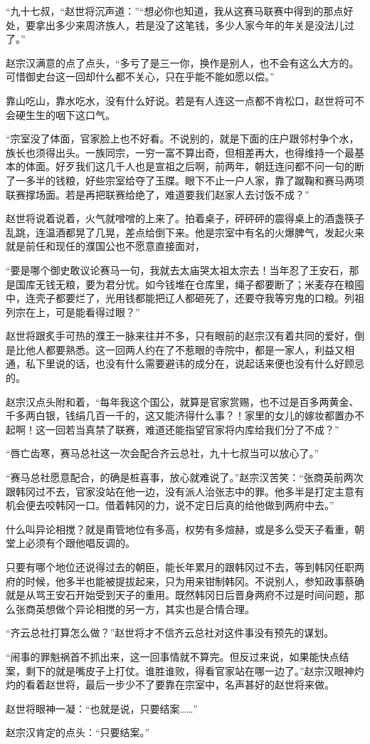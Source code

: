 “九十七叔，“赵世将沉声道：”“想必你也知道，我从这赛马联赛中得到的那点好处，要拿出多少来周济族人，若是没了这笔钱，多少人家今年的年关是没法儿过了。”

赵宗汉满意的点了点头，“多亏了是三一你，换作是别人，也不会有这么大方的。可惜御史台这一回却什么都不关心，只在乎能不能如愿以偿。”

靠山吃山，靠水吃水，没有什么好说。若是有人连这一点都不肯松口，赵世将可不会硬生生的咽下这口气。

“宗室没了体面，官家脸上也不好看。不说别的，就是下面的庄户跟邻村争个水，族长也须得出头。一族同宗，一穷一富不算出奇，但相差再大，也得维持一个最基本的体面。好歹我们这几千人也是宣祖之后啊，前两年，朝廷连问都不问一句的断了一多半的钱粮，好些宗室给夺了玉牒。眼下不止一户人家，靠了蹴鞠和赛马两项联赛撑场面。若是再把联赛给绝了，难道要我们赵家人去讨饭不成？”

赵世将说着说着，火气就噌噌的上来了。拍着桌子，砰砰砰的震得桌上的酒盏筷子乱跳，连温酒都晃了几晃，差点给倒下来。他是宗室中有名的火爆脾气，发起火来就是前任和现任的濮国公也不愿意直接面对，

“要是哪个御史敢议论赛马一句，我就去太庙哭太祖太宗去！当年忍了王安石，那是国库无钱无粮，要为君分忧。如今钱堆在仓库里，绳子都要断了；米麦存在粮囤中，连壳子都要烂了，光用钱都能把辽人都砸死了，还要夺我等穷鬼的口粮。列祖列宗在上，可是能看得过眼？”

赵世将跟炙手可热的濮王一脉来往并不多，只有眼前的赵宗汉有着共同的爱好，倒是比他人都要熟悉。这一回两人约在了不惹眼的寺院中，都是一家人，利益又相通，私下里说的话，也没有什么需要避讳的成分在，说起话来便也没有什么好顾忌的。

赵宗汉点头附和着，“每年我这个国公，就算是官家赏赐，也不过是百多两黄金、千多两白银，钱绢几百一千的，这又能济得什么事？！家里的女儿的嫁妆都置办不起啊！这一回若当真禁了联赛，难道还能指望官家将内库给我们分了不成？”

“唇亡齿寒，赛马总社这一次会配合齐云总社，九十七叔当可以放心了。”

“赛马总社愿意配合，的确是桩喜事，放心就难说了。”赵宗汉苦笑：“张商英前两次跟韩冈过不去，官家没站在他一边，没有派人治张志中的罪。他多半是打定主意有机会便去咬韩冈一口。借着韩冈的力，说不定日后真的给他做到两府中去。”

什么叫异论相搅？就是甭管地位有多高，权势有多煊赫，或是多么受天子看重，朝堂上必须有个跟他唱反调的。

只要有哪个地位还说得过去的朝臣，能长年累月的跟韩冈过不去，等到韩冈任职两府的时候，他多半也能被提拔起来，只为用来钳制韩冈。不说别人，参知政事蔡确就是从骂王安石开始受到天子的重用。既然韩冈日后晋身两府不过是时间问题，那么张商英想做个异论相搅的另一方，其实也是合情合理。

“齐云总社打算怎么做？”赵世将才不信齐云总社对这件事没有预先的谋划。

“闹事的罪魁祸首不抓出来，这一回事情就不算完。但反过来说，如果能快点结案，剩下的就是嘴皮子上打仗。谁胜谁败，得看官家站在哪一边了。”赵宗汉眼神灼灼的看着赵世将，最后一步少不了要靠在宗室中，名声甚好的赵世将来做。

赵世将眼神一凝：“也就是说，只要结案……”

赵宗汉肯定的点头：“只要结案。”

